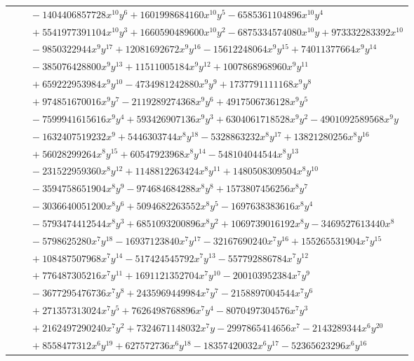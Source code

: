 \documentclass[11pt]{article}
\begin{document}
\begin{longtable}{@{}ll@{}}
 & $\quad -1404406857728x^{10}y^{6}+1601998684160x^{10}y^{5}-6585361104896x^{10}y^{4}$\\
 & $\quad +5541977391104x^{10}y^{3}+1660590489600x^{10}y^{2}-6875334574080x^{10}y+973332283392x^{10}$\\
 & $\quad -9850322944x^{9}y^{17}+12081692672x^{9}y^{16}-15612248064x^{9}y^{15}+74011377664x^{9}y^{14}$\\
 & $\quad -385076428800x^{9}y^{13}+11511005184x^{9}y^{12}+1007868968960x^{9}y^{11}$\\
 & $\quad +659222953984x^{9}y^{10}-4734981242880x^{9}y^{9}+1737791111168x^{9}y^{8}$\\
 & $\quad +974851670016x^{9}y^{7}-2119289274368x^{9}y^{6}+4917506736128x^{9}y^{5}$\\
 & $\quad -7599941615616x^{9}y^{4}+593426907136x^{9}y^{3}+6304061718528x^{9}y^{2}-4901092589568x^{9}y$\\
 & $\quad -1632407519232x^{9}+5446303744x^{8}y^{18}-5328863232x^{8}y^{17}+13821280256x^{8}y^{16}$\\
 & $\quad +56028299264x^{8}y^{15}+60547923968x^{8}y^{14}-548104044544x^{8}y^{13}$\\
 & $\quad -231522959360x^{8}y^{12}+1148812263424x^{8}y^{11}+1480508309504x^{8}y^{10}$\\
 & $\quad -3594758651904x^{8}y^{9}-974684684288x^{8}y^{8}+1573807456256x^{8}y^{7}$\\
 & $\quad -3036640051200x^{8}y^{6}+5094682263552x^{8}y^{5}-1697638383616x^{8}y^{4}$\\
 & $\quad -5793474412544x^{8}y^{3}+6851093200896x^{8}y^{2}+1069739016192x^{8}y-3469527613440x^{8}$\\
 & $\quad -5798625280x^{7}y^{18}-16937123840x^{7}y^{17}-32167690240x^{7}y^{16}+155265531904x^{7}y^{15}$\\
 & $\quad +108487507968x^{7}y^{14}-517424545792x^{7}y^{13}-557792886784x^{7}y^{12}$\\
 & $\quad +776487305216x^{7}y^{11}+1691121352704x^{7}y^{10}-200103952384x^{7}y^{9}$\\
 & $\quad -3677295476736x^{7}y^{8}+2435969449984x^{7}y^{7}-2158897004544x^{7}y^{6}$\\
 & $\quad +271357313024x^{7}y^{5}+7626498768896x^{7}y^{4}-8070497304576x^{7}y^{3}$\\
 & $\quad +2162497290240x^{7}y^{2}+7324671148032x^{7}y-2997865414656x^{7}-2143289344x^{6}y^{20}$\\
 & $\quad +8558477312x^{6}y^{19}+627572736x^{6}y^{18}-18357420032x^{6}y^{17}-52365623296x^{6}y^{16}$\\

\end{longtable}
\end{document}
